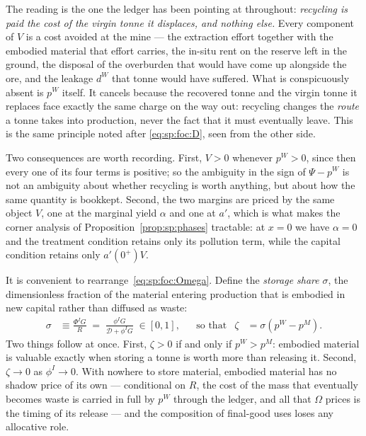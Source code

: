 The reading is the one the ledger has been pointing at throughout: \emph{recycling is paid the cost
of the virgin tonne it displaces, and nothing else.} Every component of $V$ is a cost avoided at the
mine --- the extraction effort together with the embodied material that effort carries, the in-situ
rent on the reserve left in the ground, the disposal of the overburden that would have come up
alongside the ore, and the leakage $d^W$ that tonne would have suffered. What is conspicuously
absent is $p^W$ itself. It cancels because the recovered tonne and the virgin tonne it replaces face
exactly the same charge on the way out: recycling changes the \emph{route} a tonne takes into
production, never the fact that it must eventually leave. This is the same principle noted after
\eqref{eq:sp:foc:D}, seen from the other side.

Two consequences are worth recording. First, $V>0$ whenever $p^W>0$, since then every one of its
four terms is positive; so the ambiguity in the sign of $\Psi-p^W$ is not an ambiguity about whether
recycling is worth anything, but about how the same quantity is bookkept. Second, the two margins are
priced by the same object $V$, one at the marginal yield $\alpha$ and one at $a'$, which
is what makes the corner analysis of Proposition~\ref{prop:sp:phases} tractable: at $x=0$ we have
$\alpha=0$ and the treatment condition retains only its pollution term, while the capital condition
retains only $a'\!\left(0^+\right)V$.

 It is convenient to rearrange~\eqref{eq:sp:foc:Omega}. Define the \emph{storage share} $\sigma$, the dimensionless fraction of the material entering production that is embodied in new capital rather than diffused as waste:
\begin{align}
\sigma &\equiv \frac{\Phi^IG}{R} \;=\; \frac{\phi^IG}{\mathcal D+\phi^IG}\;\in\left[0,1\right],
&&\text{so that}
&
\zeta &= \sigma\left(p^W-p^M\right).
\label{eq:sp:zeta-explicit}
\end{align}
Two things follow at once. First, $\zeta>0$ if and only if $p^W>p^M$: embodied material is valuable exactly when storing a tonne is worth more than releasing it. Second, $\zeta\to0$ as $\phi^I\to0$. With nowhere to store material, embodied material has no shadow price of its own --- conditional on $R$, the cost of the mass that eventually becomes waste is carried in full by $p^W$ through the ledger, and all that $\Omega$ prices is the timing of its release --- and the composition of final-good uses loses any allocative role.

